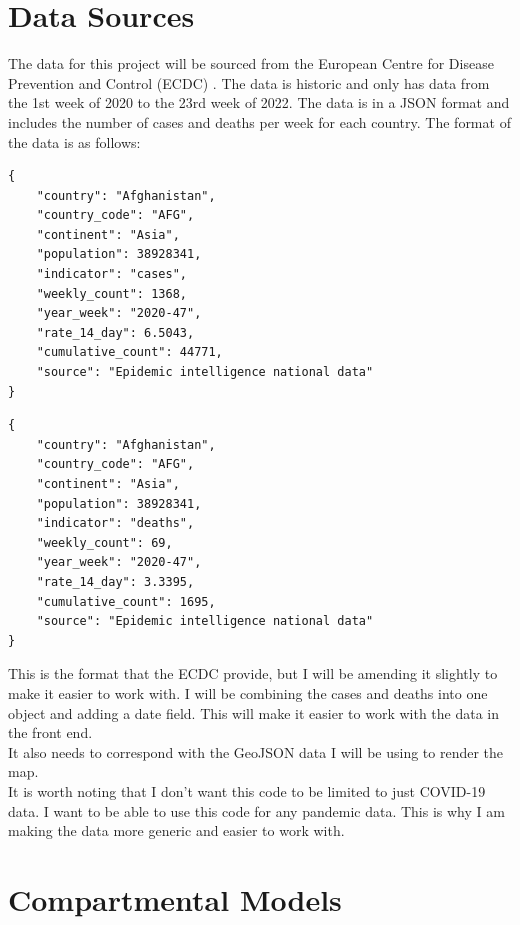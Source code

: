 \documentclass{report}
\begin{document}
\section{Data Sources}
The data for this project will be sourced from the European Centre for Disease Prevention and Control (ECDC) \cite{ecdc}. The data is historic and only has data from the 1st week of 2020 to the 23rd week of 2022. The data is in a JSON format and includes the number of cases and deaths per week for each country. The format of the data is as follows:

\begin{minipage}{0.45\textwidth}
\begin{lstlisting}[caption={Cases JSON Example}]
{
    "country": "Afghanistan",
    "country_code": "AFG",
    "continent": "Asia",
    "population": 38928341,
    "indicator": "cases",
    "weekly_count": 1368,
    "year_week": "2020-47",
    "rate_14_day": 6.5043,
    "cumulative_count": 44771,
    "source": "Epidemic intelligence national data"
}
\end{lstlisting}
\end{minipage}
\hfill
\begin{minipage}{0.45\textwidth}
\begin{lstlisting}[caption={Deaths JSON Example}]
{
    "country": "Afghanistan",
    "country_code": "AFG",
    "continent": "Asia",
    "population": 38928341,
    "indicator": "deaths",
    "weekly_count": 69,
    "year_week": "2020-47",
    "rate_14_day": 3.3395,
    "cumulative_count": 1695,
    "source": "Epidemic intelligence national data"
}
\end{lstlisting}
\end{minipage}
This is the format that the ECDC provide, but I will be amending it slightly to make it easier to work with. I will be combining the cases and deaths into one object and adding a date field. This will make it easier to work with the data in the front end.\\

It also needs to correspond with the GeoJSON data I will be using to render the map. \\

It is worth noting that I don't want this code to be limited to just COVID-19 data. I want to be able to use this code for any pandemic data. This is why I am making the data more generic and easier to work with.
\newpage
\section{Compartmental Models}
\end{document}
